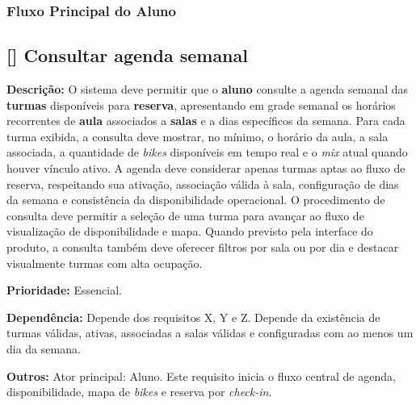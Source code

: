 \newcommand{\reqfuncfull}[6]{%
  \refstepcounter{rfreq}%
  \subsection{[\rfreqid] #2}%
  \label{#1}%
  \noindent\textbf{Descrição:} #3

  \noindent\textbf{Prioridade:} #4

  \noindent\textbf{Dependência:} #5

  \noindent\textbf{Outros:} #6

  \vspace{0.4cm}
}

\newcommand{\reqnaofunc}[2]{%
  \refstepcounter{nfreq}%
  \subsection{[\nfreqid] #2}%
  \label{#1}%
  \noindent\textbf{Descrição:} \textless preencher\textgreater

  \noindent\textbf{Prioridade:} \textless Essencial, Importante ou Desejável\textgreater

  \noindent\textbf{Dependência:} \textless informar requisitos relacionados, se houver\textgreater

  \noindent\textbf{Outros:} \textless observações, restrições ou critérios complementares\textgreater

  \vspace{0.4cm}
}

\subsubsection*{Fluxo Principal do Aluno}

\reqfuncfull
{rf:consultar_agenda_semanal}
{Consultar agenda semanal}
{O sistema deve permitir que o \textbf{aluno} consulte a agenda semanal das \textbf{turmas} disponíveis para \textbf{reserva}, apresentando em grade semanal os horários recorrentes de \textbf{aula} associados a \textbf{salas} e a dias específicos da semana. Para cada turma exibida, a consulta deve mostrar, no mínimo, o horário da aula, a sala associada, a quantidade de \textit{bikes} disponíveis em tempo real e o \textit{mix} atual quando houver vínculo ativo. A agenda deve considerar apenas turmas aptas ao fluxo de reserva, respeitando sua ativação, associação válida à sala, configuração de dias da semana e consistência da disponibilidade operacional. O procedimento de consulta deve permitir a seleção de uma turma para avançar ao fluxo de visualização de disponibilidade e mapa. Quando previsto pela interface do produto, a consulta também deve oferecer filtros por sala ou por dia e destacar visualmente turmas com alta ocupação.}
{Essencial.}
{Depende dos requisitos X, Y e Z. Depende da existência de turmas válidas, ativas, associadas a salas válidas e configuradas com ao menos um dia da semana.}
{Ator principal: Aluno. Este requisito inicia o fluxo central de agenda, disponibilidade, mapa de \textit{bikes} e reserva por \textit{check-in}.}

